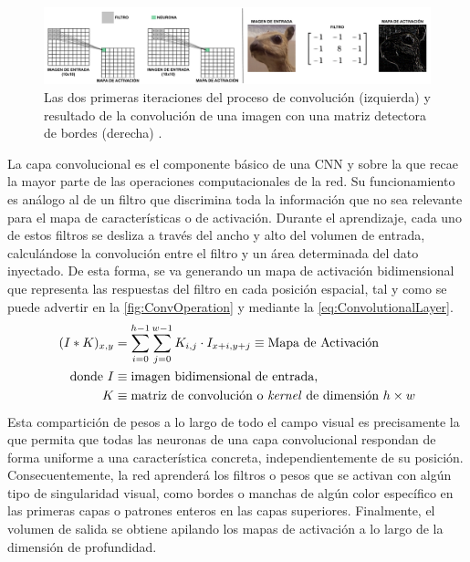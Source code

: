 \begin{figure}
    \centering
    \includegraphics[width=\textwidth]{Images/ConvOperation.png}
    \caption{Las dos primeras iteraciones del proceso de convolución (izquierda) \cite{img:ConvOperation1} y resultado de la convolución de una imagen con una matriz detectora de bordes (derecha) \cite{img:ConvOperation2}.}
    \label{fig:ConvOperation}
\end{figure}

La capa convolucional es el componente básico de una CNN y sobre la que recae la mayor parte de las operaciones computacionales de la red. Su funcionamiento es análogo al de un filtro que discrimina toda la información que no sea relevante para el mapa de características o de activación. Durante el aprendizaje, cada uno de estos filtros se desliza a través del ancho y alto del volumen de entrada, calculándose la convolución entre el filtro y un área determinada del dato inyectado. De esta forma, se va generando un mapa de activación bidimensional que representa las respuestas del filtro en cada posición espacial, tal y como se puede advertir en la \autoref{fig:ConvOperation} y mediante la \autoref{eq:ConvolutionalLayer}.
\begin{align} \label{eq:ConvolutionalLayer}
    (I \ast K)_{x,y} &= \sum\limits_{i=0}^{h -1} \sum\limits_{j=0}^{w-1} K_{i,j} \cdot I_{x+i, y+j} \equiv \text{Mapa de Activación} \\
    \text{donde}~ 
    I &\equiv \text{imagen bidimensional de entrada,} \notag \\
    K &\equiv \text{matriz de convolución o \textit{kernel} de dimensión $h\times w$} \notag
\end{align}
Esta compartición de pesos a lo largo de todo el campo visual es precisamente la que permita que todas las neuronas de una capa convolucional respondan de forma uniforme a una característica concreta, independientemente de su posición. Consecuentemente, la red aprenderá los filtros o pesos que se activan con algún tipo de singularidad visual, como bordes o manchas de algún color específico en las primeras capas o patrones enteros en las capas superiores. Finalmente, el volumen de salida se obtiene apilando los mapas de activación a lo largo de la dimensión de profundidad.

